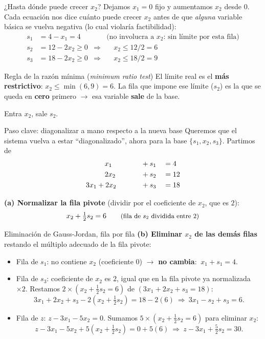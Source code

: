 \documentclass[aspectratio=169]{beamer}
\begin{document}
\begin{frame}{¿Hasta dónde puede crecer $x_2$?}
Dejamos $x_1=0$ fijo y aumentamos $x_2$ desde 0. Cada ecuación nos dice cuánto puede crecer $x_2$ antes de que \emph{alguna} variable básica se vuelva negativa (lo cual violaría factibilidad):
\[
\begin{aligned}
s_1 &= 4 - x_1 = 4 &&\text{(no involucra a $x_2$: sin límite por esta fila)}\\
s_2 &= 12 - 2x_2 \geq 0 &\Rightarrow& \quad x_2 \leq 12/2 = 6\\
s_3 &= 18 - 2x_2 \geq 0 &\Rightarrow& \quad x_2 \leq 18/2 = 9
\end{aligned}
\]
\par\medskip
\begin{alertblock}{Regla de la razón mínima (\emph{minimum ratio test})}
El límite real es el \textbf{más restrictivo}: $x_2 \leq \min(6,9) = 6$. La fila que impone ese límite ($s_2$) es la que se queda en \textbf{cero} primero $\to$ esa variable \textbf{sale} de la base.
\end{alertblock}

Entra $x_2$, sale $s_2$.
\end{frame}

\begin{frame}{Paso clave: diagonalizar a mano respecto a la nueva base}
Queremos que el sistema vuelva a estar ``diagonalizado'', ahora para la base $\{s_1, x_2, s_3\}$. Partimos de
\[
\begin{aligned}
x_1 \phantom{{}+{}2x_2} &\hphantom{{}={}}+ s_1 &&= 4 \\
2x_2 \hphantom{{}+{}x_1} &\hphantom{{}={}} + s_2 &&= 12 \\
3x_1 + 2x_2 \hphantom{{}+{}s_1} &\hphantom{{}={}} + s_3 &&= 18
\end{aligned}
\]

\textbf{(a) Normalizar la fila pivote} (dividir por el coeficiente de $x_2$, que es $2$):
\[
x_2 + \tfrac{1}{2}s_2 = 6 \qquad \text{\small (fila de $s_2$ dividida entre 2)}
\]
\end{frame}

\begin{frame}{Eliminación de Gauss-Jordan, fila por fila}
\textbf{(b) Eliminar $x_2$ de las demás filas} restando el múltiplo adecuado de la fila pivote:

\begin{itemize}
\item Fila de $s_1$: no contiene $x_2$ (coeficiente 0) $\to$ \textbf{no cambia}: $\ x_1 + s_1 = 4$.
\item Fila de $s_3$: coeficiente de $x_2$ es $2$, igual que en la fila pivote ya normalizada $\times 2$. Restamos $2\times(x_2+\tfrac12 s_2=6)$ de $(3x_1+2x_2+s_3=18)$:
\[
3x_1 + 2x_2 + s_3 - 2\left(x_2+\tfrac12 s_2\right) = 18 - 2(6)
\ \Longrightarrow\
3x_1 - s_2 + s_3 = 6.
\]
\item Fila de $z$: $z-3x_1-5x_2=0$. Sumamos $5\times(x_2+\tfrac12 s_2=6)$ para eliminar $x_2$:
\[
z - 3x_1 - 5x_2 + 5\left(x_2+\tfrac12 s_2\right) = 0+5(6)
\ \Longrightarrow\
z - 3x_1 + \tfrac{5}{2}s_2 = 30.
\]
\end{itemize}
\end{frame}
\end{document}
